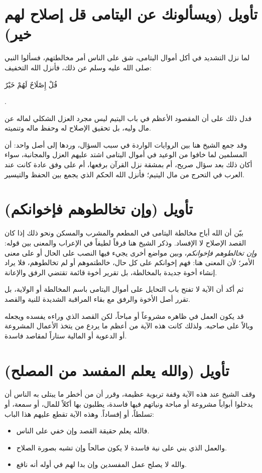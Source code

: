 \separator

\section{تأويل (ويسألونك عن اليتامى قل إصلاح لهم خير)}
 لما نزل التشديد في أكل أموال اليتامى، شق على الناس أمر مخالطتهم، فسألوا النبي صلى الله عليه وسلم عن ذلك، فأنزل الله التخفيف: \begin{ayah}قُلْ إِصْلَاحٌ لَهُمْ خَيْرٌ\end{ayah}.

فدل ذلك على أن المقصود الأعظم في باب اليتيم ليس مجرد العزل الشكلي لماله عن مال وليه، بل تحقيق الإصلاح له وحفظ ماله وتنميته.

وقد جمع الشيخ هنا بين الروايات الواردة في سبب السؤال، وردها إلى أصل واحد: أن المسلمين لما خافوا من الوعيد في أموال اليتامى اشتد عليهم العزل والمجانبة، سواء أكان ذلك بعد سؤال صريح، أم بمشقة نزل القرآن برفعها، أم على وفق عادة كانت عند العرب في التحرج من مال اليتيم؛ فأنزل الله الحكم الذي يجمع بين الحفظ والتيسير.

\section{تأويل (وإن تخالطوهم فإخوانكم)}
بيّن  أن الله أباح مخالطة اليتامى في المطعم والمشرب والمسكن ونحو ذلك إذا كان القصد الإصلاح لا الإفساد. وذكر الشيخ هنا فرقاً لطيفاً في الإعراب والمعنى بين قوله: \textit{وإن تخالطوهم فإخوانكم}، وبين مواضع أخرى يجيء فيها النصب على الحال أو على معنى الأمر؛ لأن المعنى هنا: فهم إخوانكم على كل حال، خالطتموهم أو لم تخالطوهم، فلا يراد إنشاء أخوة جديدة بالمخالطة، بل تقرير أخوة قائمة تقتضي الرفق والإعانة.

ثم أكد أن الآية لا تفتح باب التحايل على أموال اليتامى باسم المخالطة أو الولاية، بل تقرر أصل الأخوة والرفق مع بقاء المراقبة الشديدة للنية والقصد.

\begin{fawaid}
قد يكون العمل في ظاهره مشروعاً أو مباحاً، لكن القصد الذي وراءه يفسده ويجعله وبالاً على صاحبه. ولذلك كانت هذه الآية من أعظم ما يردع من يتخذ الأعمال المشروعة أو الدعوية أو المالية ستاراً لمقاصد فاسدة.
\end{fawaid}

\section{تأويل (والله يعلم المفسد من المصلح)}
وقف الشيخ عند هذه الآية وقفة تربوية عظيمة، وقرر أن من أخطر ما يبتلى به الناس أن يدخلوا أبواباً مشروعة أو مباحة ونياتهم فيها فاسدة، يطلبون بها أكلاً للمال، أو سمعة، أو تسلطاً، أو إفساداً. وهذه الآية تقطع عليهم هذا الباب:
\begin{itemize}
    \item فالله يعلم حقيقة القصد وإن خفي على الناس.
    \item والعمل الذي بني على نية فاسدة لا يكون صالحاً وإن تشبه بصورة الصلاح.
    \item والله لا يصلح عمل المفسدين وإن بدا لهم في أوله أنه نافع.
\end{itemize}

